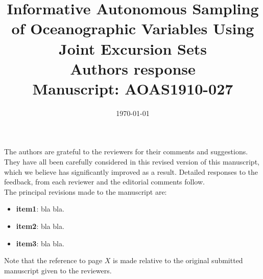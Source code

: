 \documentclass[a4paper]{article}
\newcounter{reviewer}
\begin{document}
\title{Informative Autonomous Sampling of Oceanographic Variables Using Joint Excursion Sets
  \\\vspace{5mm}
 Authors response
  \\\vspace{5mm}
\small{Manuscript: AOAS1910-027}}
\author{ }

\date{\today}

\maketitle

The authors are grateful to the reviewers for their comments and
suggestions. They have all been carefully considered in this revised
version of this manuscript, which we believe has significantly
improved as a result. Detailed responses to the feedback, from each reviewer and the editorial comments follow.\\

The principal revisions made to the manuscript are:
\vspace{0.5cm}

\begin{itemize}[noitemsep, topsep=0pt, parsep=0pt, partopsep=0pt]
\item \textbf{item1}: bla bla.
\item \textbf{item2}: bla bla.
\item \textbf{item3}: bla bla.
\end{itemize}
\par \vspace{1em}
Note that the reference to page $X$ is made relative to
the original submitted manuscript given to the reviewers.

\end{document}
